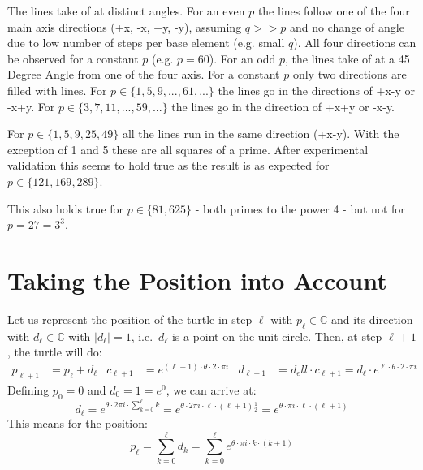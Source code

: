 \documentclass[pdftex,a4paper]{scrartcl}
\begin{document}
The lines take of at distinct angles. For an even $p$ the lines follow one of the four main axis directions (+x, -x, +y, -y),
assuming $q >> p$ and no change of angle due to low number of steps per base element (e.g. small $q$).
All four directions can be observed for a constant $p$ (e.g. $p = 60$).
For an odd $p$, the lines take of at a 45 Degree Angle from one of the four axis. For a constant $p$ only two directions are
filled with lines. For $p \in \{1, 5, 9, ..., 61, ...\}$ the lines go in the directions of +x-y or -x+y.
For $p \in \{3, 7, 11, ..., 59, ...\}$ the lines go in the direction of +x+y or -x-y.

For $p \in \{1, 5, 9, 25, 49\}$ all the lines run in the same direction (+x-y). With the exception of 1 and 5 these are all
squares of a prime. After experimental validation this seems to hold true as the result is as expected for $p \in \{121, 169, 289\}$.

This also holds true for $p \in \{81, 625\}$ - both primes to the power 4 - but not for $p = 27 = 3^3$.

\section{Taking the Position into Account}
Let us represent the position of the turtle in step \(\ell\) with \(p_\ell\in\mathbb{C}\) and its direction with
\(d_\ell\in\mathbb{C}\) with \(|d_\ell|=1\), i.e.\ \(d_\ell\) is a point on the unit circle. Then, at step \(\ell+1\), the turtle
will do:
\begin{align*}
p_{\ell+1} &= p_\ell + d_\ell &
c_{\ell+1} &= e^{(\ell+1)\cdot \theta\cdot 2\cdot \pi i} &
d_{\ell+1} &= d_ell\cdot c_{\ell+1} = d_\ell \cdot e^{\ell\cdot \theta\cdot 2\cdot \pi i}
\end{align*}
Defining \(p_0=0\) and \(d_0=1=e^0\), we can arrive at:
\[
d_\ell = e^{\theta\cdot 2\pi i\cdot \sum_{k=0}^\ell k}
= e^{\theta\cdot 2\pi i \cdot \ell\cdot(\ell+1)\frac{1}{2}}
= e^{\theta\cdot \pi i \cdot \ell\cdot(\ell+1)}
\]
This means for the position:
\[
p_\ell = \sum_{k=0}^\ell d_k
= \sum_{k=0}^\ell e^{\theta\cdot \pi i\cdot k\cdot(k+1)}
\]
\end{document}
